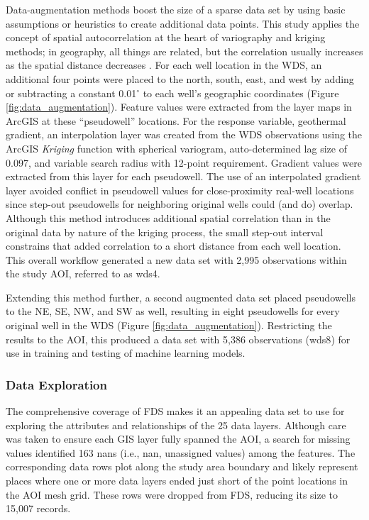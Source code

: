 Data-augmentation methods boost the size of a sparse data set by using basic assumptions or heuristics to create additional data points. This study applies the concept of spatial autocorrelation at the heart of variography and kriging methods; in geography, all things are related, but the correlation usually increases as the spatial distance decreases \citep[Chapter\ 13]{gimond_intro_2021}. For each well location in the WDS, an additional four points were placed to the north, south, east, and west by adding or subtracting a constant 0.01$^\circ$ to each well’s geographic coordinates (Figure \ref{fig:data_augmentation}). Feature values were extracted from the layer maps in ArcGIS at these ``pseudowell'' locations. For the response variable, geothermal gradient, an interpolation layer was created from the WDS observations using the ArcGIS \textit{Kriging} function with spherical variogram, auto-determined lag size of 0.097, and variable search radius with 12-point requirement. Gradient values were extracted from this layer for each pseudowell. The use of an interpolated gradient layer avoided conflict in pseudowell values for close-proximity real-well locations since step-out pseudowells for neighboring original wells could (and do) overlap. Although this method introduces additional spatial correlation than in the original data by nature of the kriging process, the small step-out interval constrains that added correlation to a short distance from each well location. This overall workflow generated a new data set with 2,995 observations within the study AOI, referred to as \acrshort{wds4}. 

Extending this method further, a second augmented data set placed pseudowells to the NE, SE, NW, and SW as well, resulting in eight pseudowells for every original well in the WDS (Figure \ref{fig:data_augmentation}). Restricting the results to the AOI, this produced a data set with 5,386 observations (\acrshort{wds8}) for use in training and testing of machine learning models.

\subsubsection{Data Exploration}

The comprehensive coverage of FDS makes it an appealing data set to use for exploring the attributes and relationships of the 25 data layers. Although care was taken to ensure each GIS layer fully spanned the AOI, a search for missing values identified 163 \acrshort{nan}s (i.e., \acrlong{nan}, unassigned values) among the features. The corresponding data rows plot along the study area boundary and likely represent places where one or more data layers ended just short of the point locations in the AOI mesh grid. These rows were dropped from FDS, reducing its size to 15,007 records.

